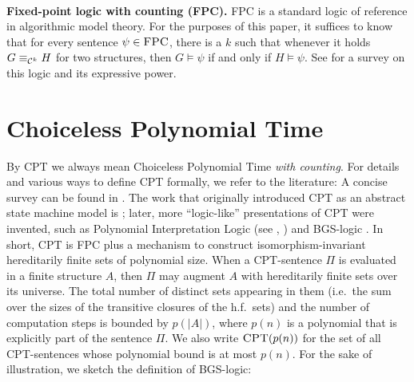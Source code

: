 \documentclass[a4paper,UKenglish,cleveref, autoref, thm-restate]{lipics-v2021}
\newcommand{\FPC}{\mbox{\sc FPC}}
\newcommand{\CPT}{\mbox{\sc CPT}}
\newcommand{\Cc}{{\cal C}}
\begin{document}
	\\
	\textbf{Fixed-point logic with counting (FPC).} FPC is a standard logic of reference in algorithmic model theory. For the purposes of this paper, it suffices to know that for every sentence $\psi \in \FPC$, there is a $k$ such that whenever it holds $G \equiv_{\Cc^k} H$ for two structures, then $G \models \psi$ if and only if $H \models \psi$.
	See \cite{dawar2015nature} for a survey on this logic and its expressive power.
	
	
	
	\section{Choiceless Polynomial Time}
	\label{sec:CPT}
	By CPT we always mean Choiceless Polynomial Time \emph{with counting}. For details and various ways to define CPT formally, we refer to the literature: A concise survey can be found in \cite{gradel2015polynomial}. The work that originally introduced CPT as an abstract state machine model is \cite{blass1999}; later, more ``logic-like'' presentations of CPT were invented, such as Polynomial Interpretation Logic (see \cite{grapakschalkai15}, \cite{svenja}) and BGS-logic \cite{rossman2010choiceless}. In short, CPT is FPC plus a mechanism to construct isomorphism-invariant hereditarily finite sets of polynomial size. When a CPT-sentence $\Pi$ is evaluated in a finite structure $A$, then $\Pi$ may augment $A$ with hereditarily finite sets over its universe. The total number of distinct sets appearing in them (i.e.\ the sum over the sizes of the transitive closures of the h.f.\ sets) and the number of computation steps is bounded by $p(|A|)$, where $p(n)$ is a polynomial that is explicitly part of the sentence $\Pi$. We also write $\CPT(p(n))$ for the set of all CPT-sentences whose polynomial bound is at most $p(n)$. For the sake of illustration, we sketch the definition of BGS-logic:\\
	
\end{document}
